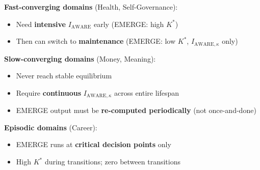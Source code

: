 \begin{tcolorbox}[colback=red!5!white, colframe=red!75!black,
    title=\textbf{Critical Design Principle: Maintenance vs. Acquisition}]

\textbf{Fast-converging domains} (Health, Self-Governance):
\begin{itemize}[nosep]
    \item Need \textbf{intensive} $I_{\text{AWARE}}$ early (EMERGE: high $K^*$)
    \item Then can switch to \textbf{maintenance} (EMERGE: low $K^*$, $I_{\text{AWARE},\kappa}$ only)
\end{itemize}

\textbf{Slow-converging domains} (Money, Meaning):
\begin{itemize}[nosep]
    \item Never reach stable equilibrium
    \item Require \textbf{continuous} $I_{\text{AWARE},\kappa}$ across entire lifespan
    \item EMERGE output must be \textbf{re-computed periodically} (not once-and-done)
\end{itemize}

\textbf{Episodic domains} (Career):
\begin{itemize}[nosep]
    \item EMERGE runs at \textbf{critical decision points} only
    \item High $K^*$ during transitions; zero between transitions
\end{itemize}

\end{tcolorbox}

